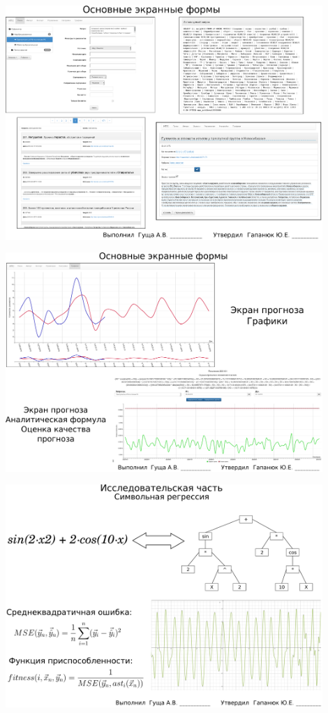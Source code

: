 \documentclass[russian,utf8, a1paper, emptystyle]{eskdgraph}
\begin{document}
\begin{ESKDdrawing}
\includegraphics[width=0.90\textwidth]{lists/list9_1}
\end{ESKDdrawing}

\begin{ESKDdrawing}
\includegraphics[width=0.90\textwidth]{lists/list9_2}
\end{ESKDdrawing}


\begin{ESKDdrawing}
\includegraphics[width=0.90\textwidth]{lists/list10_1}
\end{ESKDdrawing}
\end{document}
